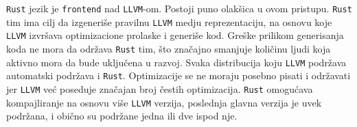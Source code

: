 \verb|Rust| jezik je \verb|frontend| nad \verb|LLVM|-om. Postoji puno olakšica u ovom pristupu.
\verb|Rust| tim ima cilj da izgeneriše pravilnu \verb|LLVM| medju reprezentaciju, na osnovu koje 
\verb|LLVM| izvršava optimizacione prolaske i generiše kod. Greške prilikom generisanja koda ne mora da 
održava \verb|Rust| tim, što značajno smanjuje količinu ljudi koja aktivno mora da bude uključena u razvoj. 
Svaka distribucija koju \verb|LLVM| podržava automatski podržava i \verb|Rust|. Optimizacije se ne moraju 
posebno pisati i održavati jer \verb|LLVM| već poseduje značajan broj čestih optimizacija. \verb|Rust| 
omogućava kompajliranje na osnovu više \verb|LLVM| verzija, poslednja glavna verzija je uvek podržana,
i obično su podržane jedna ili dve ispod nje.

